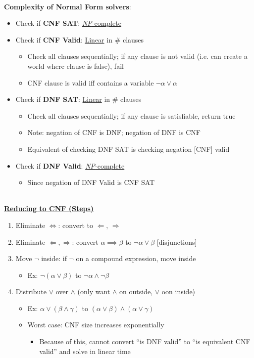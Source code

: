 \documentclass[12pt]{extarticle}
\theoremstyle{definition}
\theoremstyle{remark}
\newcommand{\pstart}[0]{\noindent}
\newcommand{\newp}[0]{~\\ \pstart}
\newcommand{\titleul}[1]{\noindent \textbf{\ul{#1}}}
\begin{document}
\newp
\textbf{Complexity of Normal Form solvers}: \begin{itemize}
    \item Check if \textbf{CNF SAT}: \ul{\textit{NP}-complete}
    \item Check if \textbf{CNF Valid}: \ul{Linear} in \# clauses \begin{itemize}
            \item Check all clauses sequentially; if any clause is not valid (i.e. can create a world where clause is false), fail
            \item CNF clause is valid iff contains a variable $\neg\alpha\lor\alpha$ 
        \end{itemize}
    \item Check if \textbf{DNF SAT}: \ul{Linear} in \# clauses \begin{itemize}
        \item Check all clauses sequentially; if any clause is satisfiable, return true 
        \item Note: negation of CNF is DNF; negation of DNF is CNF
        \item Equivalent of checking DNF SAT is checking negation [CNF] valid
    \end{itemize}
    \item Check if \textbf{DNF Valid}: \ul{\textit{NP}-complete} \begin{itemize}
        \item Since negation of DNF Valid is CNF SAT
    \end{itemize}
\end{itemize}

\newp
\titleul{Reducing to CNF (Steps)} \begin{enumerate}
    \item Eliminate $\Longleftrightarrow$: convert to $\Longleftarrow$, $\Longrightarrow$
    \item Eliminate $\Longleftarrow,\Longrightarrow$: convert $\alpha\implies\beta$ to $\neg\alpha\lor\beta$ [disjunctions]
    \item Move $\neg$ inside: if $\neg$ on a compound expression, move inside \begin{itemize}
        \item Ex: $\neg(\alpha\lor\beta)$ to $\neg\alpha\land\neg\beta$
    \end{itemize}
    \item Distribute $\lor$ over $\land$ (only want $\land$ on outside, $\lor$ oon inside) \begin{itemize}
        \item Ex: $\alpha\lor(\beta\land\gamma)$ to $(\alpha\lor\beta)\land(\alpha\lor\gamma)$
        \item Worst case: CNF size increases exponentially \begin{itemize}
            \item Because of this, cannot convert ``is DNF valid'' to ``is equivalent CNF valid'' and solve in linear time
        \end{itemize}
    \end{itemize}
\end{enumerate}
\end{document}
